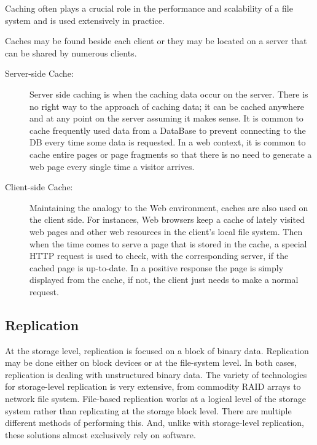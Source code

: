 Caching often plays a crucial role in the performance and scalability of a file system and is used extensively in practice.

Caches may be found beside each client or they may be located on a server that can be shared by numerous clients.

\begin{description}
	\item [Server-side Cache:] Server side caching is when the caching data occur on the server. There is no right way to the approach of caching data; it can be cached anywhere and at any point on the server assuming it makes sense. It is common to cache frequently used data from a DataBase to prevent connecting to the DB every time some data is requested. In a web context, it is common to cache entire pages or page fragments so that there is no need to generate a web page every single time a visitor arrives.
	\item [Client-side Cache:] Maintaining the analogy to the Web environment, caches are also used on the client side. For instances, Web browsers keep a cache of lately visited web pages and other web resources in the client’s local file system. Then when the time comes to serve a page that is stored in the cache, a special HTTP request is used to check, with the corresponding server, if the cached page is up-to-date. In a positive response the page is simply displayed from the cache, if not, the client just needs to make a normal request.
\end{description}

\newpage


\subsection{Replication} %
\label{sub:replication_consistency}

At the storage level, replication is focused on a block of binary data. Replication may be done either on block devices or at the file-system level. In both cases, replication is dealing with unstructured binary data. The variety of technologies for storage-level replication is very extensive, from commodity RAID arrays to network file system.
File-based replication works at a logical level of the storage system rather than replicating at the storage block level. There are multiple different methods of performing this. And, unlike with storage-level replication, these solutions almost exclusively rely on software.

